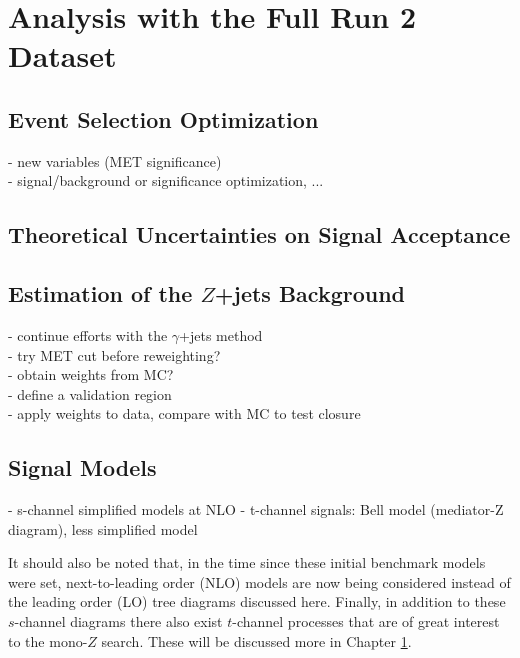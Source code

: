 \chapter{Analysis with the Full Run 2 Dataset}
\label{chapter:fullRun2}

\section{Event Selection Optimization}
- new variables (MET significance)\\
- signal/background or significance optimization, ...\\

\section{Theoretical Uncertainties on Signal Acceptance}

\section{Estimation of the $Z$+jets Background}

- continue efforts with the $\gamma$+jets method\\
- try MET cut before reweighting?\\
- obtain weights from MC?\\
- define a validation region\\
- apply weights to data, compare with MC to test closure\\

\section{Signal Models}
- s-channel simplified models at NLO
- t-channel signals: Bell model (mediator-Z diagram), less simplified model

It should also be noted that, in the time since these initial benchmark models were set, next-to-leading order (NLO) models are now being considered instead of the leading order (LO) tree diagrams discussed here. Finally, in addition to these $s$-channel diagrams there also exist $t$-channel processes that are of great interest to the mono-$Z$ search. These will be discussed more in Chapter \ref{chapter:fullRun2}.

